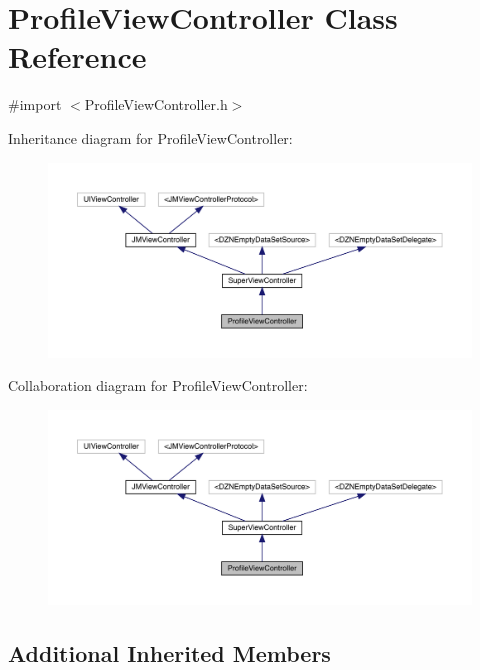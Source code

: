 \hypertarget{interface_profile_view_controller}{}\section{Profile\+View\+Controller Class Reference}
\label{interface_profile_view_controller}


{\ttfamily \#import $<$Profile\+View\+Controller.\+h$>$}



Inheritance diagram for Profile\+View\+Controller\+:\nopagebreak
\begin{figure}[H]
\begin{center}
\leavevmode
\includegraphics[width=350pt]{interface_profile_view_controller__inherit__graph}
\end{center}
\end{figure}


Collaboration diagram for Profile\+View\+Controller\+:\nopagebreak
\begin{figure}[H]
\begin{center}
\leavevmode
\includegraphics[width=350pt]{interface_profile_view_controller__coll__graph}
\end{center}
\end{figure}
\subsection*{Additional Inherited Members}


